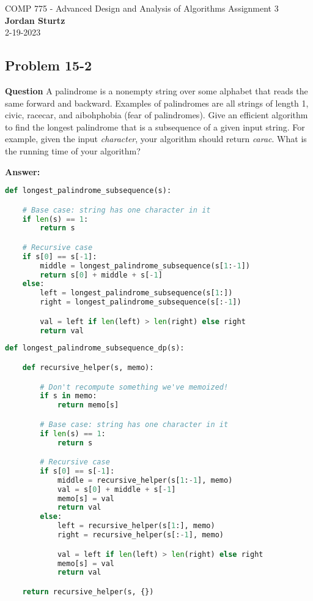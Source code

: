 \documentclass[]{book}
\theoremstyle{definition}
\begin{document}
\begin{center}
{\Large COMP 775 - Advanced Design and Analysis of Algorithms \hspace{0.5cm} Assignment 3}\\
\textbf{Jordan Sturtz}\\ %
2-19-2023 %
\end{center}

\vspace{0.2 cm}

\subsection*{Problem 15-2}

\textbf{Question} 
A palindrome is a nonempty string over some alphabet that reads the same forward and backward. Examples of palindromes are all strings of length 1, civic, racecar, and aibohphobia (fear of palindromes).
Give an efficient algorithm to find the longest palindrome that is a subsequence of a given input string. For example, given the input \textit{character}, your algorithm should return \textit{carac}. What is the running time of your algorithm?

\textbf{Answer:} 

\begin{lstlisting}[language=Python, caption=Longest Palindrome Subsequence without DP, label=snip:withoutdp]
def longest_palindrome_subsequence(s):

    # Base case: string has one character in it
    if len(s) == 1:
        return s

    # Recursive case
    if s[0] == s[-1]:
        middle = longest_palindrome_subsequence(s[1:-1])
        return s[0] + middle + s[-1]
    else:
        left = longest_palindrome_subsequence(s[1:])
        right = longest_palindrome_subsequence(s[:-1])

        val = left if len(left) > len(right) else right
        return val\end{lstlisting}

\begin{lstlisting}[language=Python, caption=Longest Palindrome Subsequence with Memoization, label=snip:withdp]
def longest_palindrome_subsequence_dp(s):

    def recursive_helper(s, memo):

        # Don't recompute something we've memoized!
        if s in memo:
            return memo[s]

        # Base case: string has one character in it
        if len(s) == 1:
            return s

        # Recursive case
        if s[0] == s[-1]:
            middle = recursive_helper(s[1:-1], memo)
            val = s[0] + middle + s[-1]
            memo[s] = val
            return val
        else:
            left = recursive_helper(s[1:], memo)
            right = recursive_helper(s[:-1], memo)

            val = left if len(left) > len(right) else right
            memo[s] = val
            return val

    return recursive_helper(s, {})\end{lstlisting}
\end{document}
